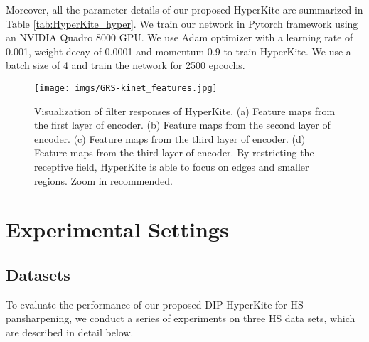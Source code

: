 \documentclass[journal]{IEEEtran}
\begin{document}
    
Moreover, all the parameter details of our proposed HyperKite are  summarized in Table \ref{tab:HyperKite_hyper}. We train our network in Pytorch framework using an NVIDIA Quadro 8000 GPU. We use Adam optimizer with a learning rate of 0.001, weight decay of 0.0001 and momentum 0.9 to train HyperKite. We use a batch size of 4 and train the network for 2500 epcochs.

    \begin{figure}[tb]
        \centering
        \texttt{[image: imgs/GRS-kinet\_features.jpg]}
        \caption{Visualization of filter responses of HyperKite. (a) Feature maps from the first layer of encoder. (b) Feature maps from the second layer of encoder. (c) Feature maps from the third layer of encoder. (d) Feature maps from the third layer of encoder. By restricting the receptive field, HyperKite is able to focus on edges and smaller regions. Zoom in recommended.}
        \label{fig:HyperKite_feature_maps}
    \end{figure}

\section{Experimental Settings}
\label{sec: experimental_settings}
    \subsection{Datasets}
        \label{sec:datasets}
        To evaluate the performance of our proposed DIP-HyperKite for HS pansharpening, we conduct a series of experiments on three HS data sets, which are described in detail below.
        
\end{document}

